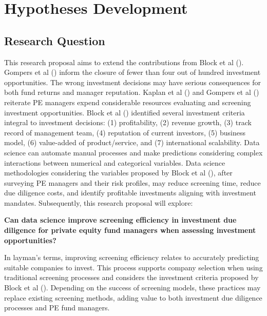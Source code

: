 \documentclass[12pt]{article}
\begin{document}
\section{Hypotheses Development}\label{Hyp-dev}
\subsection{Research Question}
This research proposal aims to extend the contributions from Block et al (\citeyear{BLOCK2019329}).
Gompers et al (\cite{gompers2016private}) inform the closure of fewer than four out of hundred investment opportunities.
The wrong investment decisions may have serious consequences for both fund returns and manager reputation.
Kaplan et al (\citeyear{kaplan2001venture}) and Gompers et al (\citeyear{gompers2016private}) reiterate PE managers expend considerable resources evaluating and screening investment opportunities.
Block et al (\citeyear{BLOCK2019329}) identified several investment criteria integral to investment decisions: 
(1) profitability, (2) revenue growth, (3) track record of management team, (4) reputation of current investors, (5) business model, (6) value-added of product/service, and (7) international scalability.
Data science can automate manual processes and make predictions considering complex interactions between numerical and categorical variables.
Data science methodologies considering the variables proposed by Block et al (\citeyear{BLOCK2019329}), after surveying PE managers and their risk profiles,
may reduce screening time, reduce due diligence costs, and identify profitable investments aligning with investment mandates.
Subsequently, this research proposal will explore:
\begin{center}
	\textbf{Can data science improve screening efficiency in investment due diligence for private equity fund managers when assessing investment opportunities?}
\end{center}
In layman's terms, improving screening efficiency relates to accurately predicting suitable companies to invest.
This process supports company selection when using traditional screening processes and considers the investment criteria proposed by Block et al (\citeyear{BLOCK2019329}).
Depending on the success of screening models, these practices may replace existing screening methods, adding value to both investment due diligence processes and PE fund managers.
\end{document}
